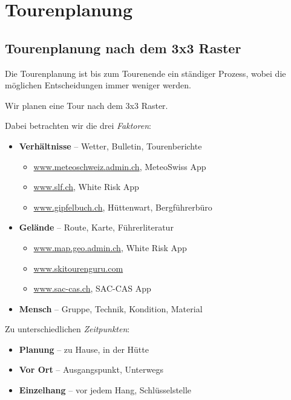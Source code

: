 \section{Tourenplanung}

\subsection{Tourenplanung nach dem 3x3 Raster}

Die Tourenplanung ist bis zum Tourenende ein ständiger Prozess, wobei die möglichen Entscheidungen immer weniger werden.

Wir planen eine Tour nach dem 3x3 Raster.

Dabei betrachten wir die drei \textit{Faktoren}:

\begin{itemize}
  \item{
    \textbf{Verhältnisse} -- Wetter, Bulletin, Tourenberichte
    \begin{itemize}
      \item{\href{https://www.meteoschweiz.admin.ch/}{www.meteoschweiz.admin.ch}, MeteoSwiss App}
      \item{\href{https://www.slf.ch/}{www.slf.ch}, White Risk App}
      \item{\href{https://www.gipfelbuch.ch/}{www.gipfelbuch.ch}, Hüttenwart, Bergführerbüro}
    \end{itemize}
  }
  \item{\textbf{Gelände} -- Route, Karte, Führerliteratur
    \begin{itemize}
      \item{\href{https://s.geo.admin.ch/y34y7btkqsvz}{www.map.geo.admin.ch}, White Risk App}
      \item{\href{https://www.skitourenguru.com//}{www.skitourenguru.com}}
      \item{\href{https://www.sac-cas.ch/de/huetten-und-touren/sac-tourenportal/}{www.sac-cas.ch}, SAC-CAS App}
    \end{itemize}
  }
  \item{\textbf{Mensch} -- Gruppe, Technik, Kondition, Material}
\end{itemize}

Zu unterschiedlichen \textit{Zeitpunkten}:

\begin{itemize}
  \item{\textbf{Planung} -- zu Hause, in der Hütte}
  \item{\textbf{Vor Ort} -- Ausgangspunkt, Unterwegs}
  \item{\textbf{Einzelhang} -- vor jedem Hang, Schlüsselstelle}
\end{itemize}

